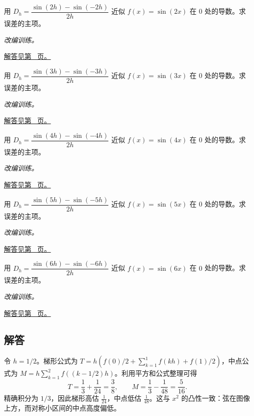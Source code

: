 \documentclass[UTF8,12pt,a4paper,fontset=fandol]{ctexart}
\begin{document}
\begin{example}[中心差分的截断误差]\label{ex:c18q20}
用 $D_h=\dfrac{\sin(2h)-\sin(-2h)}{2h}$ 近似 $f(x)=\sin(2x)$ 在 $0$ 处的导数。求误差的主项。
\par\textit{改编训练。}\par\hyperref[ans:c18q20]{解答见第~\pageref{ans:c18q20} 页。}
\end{example}
\begin{example}[中心差分的截断误差]\label{ex:c18q21}
用 $D_h=\dfrac{\sin(3h)-\sin(-3h)}{2h}$ 近似 $f(x)=\sin(3x)$ 在 $0$ 处的导数。求误差的主项。
\par\textit{改编训练。}\par\hyperref[ans:c18q21]{解答见第~\pageref{ans:c18q21} 页。}
\end{example}
\begin{example}[中心差分的截断误差]\label{ex:c18q22}
用 $D_h=\dfrac{\sin(4h)-\sin(-4h)}{2h}$ 近似 $f(x)=\sin(4x)$ 在 $0$ 处的导数。求误差的主项。
\par\textit{改编训练。}\par\hyperref[ans:c18q22]{解答见第~\pageref{ans:c18q22} 页。}
\end{example}
\begin{example}[中心差分的截断误差]\label{ex:c18q23}
用 $D_h=\dfrac{\sin(5h)-\sin(-5h)}{2h}$ 近似 $f(x)=\sin(5x)$ 在 $0$ 处的导数。求误差的主项。
\par\textit{改编训练。}\par\hyperref[ans:c18q23]{解答见第~\pageref{ans:c18q23} 页。}
\end{example}
\begin{example}[中心差分的截断误差]\label{ex:c18q24}
用 $D_h=\dfrac{\sin(6h)-\sin(-6h)}{2h}$ 近似 $f(x)=\sin(6x)$ 在 $0$ 处的导数。求误差的主项。
\par\textit{改编训练。}\par\hyperref[ans:c18q24]{解答见第~\pageref{ans:c18q24} 页。}
\end{example}
\subsection{解答}
\begin{solve}\label{ans:c18q1}
令 $h=1/2$。梯形公式为 $T=h(f(0)/2+\sum_{k=1}^{1}f(kh)+f(1)/2)$，中点公式为 $M=h\sum_{k=1}^{2}f((k-1/2)h)$。利用平方和公式整理可得
\[
T=\frac13+\frac1{24}=\frac{3}{8},\qquad M=\frac13-\frac1{48}=\frac{5}{16}.
\]
精确积分为 $1/3$，因此梯形高估 $\frac{1}{24}$，中点低估 $\frac{1}{48}$。这与 $x^2$ 的凸性一致：弦在图像上方，而对称小区间的中点高度偏低。
\end{solve}
\end{document}
